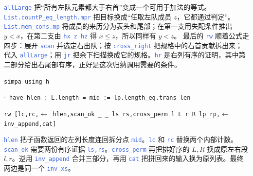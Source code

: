 \documentclass[UTF8,11pt,a4paper,fontset=fandol]{ctexart}
\newcommand{\src}[1]{\textcolor{RoyalBlue}{\texttt{#1}}}
\newcommand{\subhead}[1]{\par\vspace{3pt}{\heiti\bfseries\color{RoyalBlue}#1}\par}
\newenvironment{leanblock}{\par\smallskip\noindent\begin{lrbox}{\leanbox}\begin{minipage}{\dimexpr\linewidth-12pt\relax}\raggedright\small\setlength{\parskip}{0pt}}{\end{minipage}\end{lrbox}\colorbox{RoyalBlue!6}{\usebox{\leanbox}}\par\smallskip}
\newcommand{\lineofcode}[2]{\noindent\hspace*{#1em}\strut\texttt{#2}\par}
\begin{document}
\src{allLarge} 把“所有左队元素都大于右首”变成一个可用于加法的等式。\src{List.countP\_eq\_length.mpr} 把目标换成“任取左队成员 $z$，它都通过判定”。\src{List.mem\_cons.mp} 将成员的来历分为表头和尾部；在第一支用失配条件推出 $y<x$，在第二支由 \src{hx z hz} 得 $x\le z$，所以同样有 $y<z$。
最后的 \src{rw} 顺着公式走四步：展开 \src{scan} 并选定右出队；按 \src{cross\_right} 把规格中的右首贡献拆出来；代入 \src{allLarge}；用 \src{jr} 把余下扫描换成它的规格。\src{hr} 是右列有序的证明，其中第二部分给出右尾部有序，正好是这次归纳调用需要的条件。
\subhead{从局部等式返回总数}
\begin{leanblock}
\lineofcode{2.7}{simpa using h}
\lineofcode{1.8}{\ensuremath{\cdot} have hlen : L.length = mid := lp.length\_eq.trans len}
\lineofcode{2.7}{rw [lc,rc,\ensuremath{\leftarrow} hlen,scan\_ok \_ \_ ls rs,cross\_perm l L r R lp rp,\ensuremath{\leftarrow} inv\_append,cat]}
\end{leanblock}
\src{hlen} 把子函数返回的左列长度连回拆分点 \src{mid}。\src{lc} 和 \src{rc} 替换两个内部计数。\src{scan\_ok} 需要两份有序证据 \src{ls,rs}。\src{cross\_perm} 再把排好序的 $L,R$ 换成原左右段 $l,r$。逆用 \src{inv\_append} 合并三部分，再用 \src{cat} 把拼回来的输入换为原列表。最终两边是同一个 \src{inv xs}。
\par{}
\end{document}
